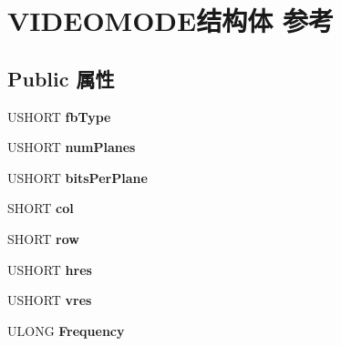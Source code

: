 \hypertarget{struct_v_i_d_e_o_m_o_d_e}{}\section{V\+I\+D\+E\+O\+M\+O\+D\+E结构体 参考}
\label{struct_v_i_d_e_o_m_o_d_e}
\subsection*{Public 属性}
\begin{DoxyCompactItemize}
\item 
\mbox{\label{struct_v_i_d_e_o_m_o_d_e_adb5309f18fe5cae6007d4b016e06a90e}} 
U\+S\+H\+O\+RT {\bfseries fb\+Type}
\item 
\mbox{\label{struct_v_i_d_e_o_m_o_d_e_a9226fad223cb28b54c5a1d9e00a4f569}} 
U\+S\+H\+O\+RT {\bfseries num\+Planes}
\item 
\mbox{\label{struct_v_i_d_e_o_m_o_d_e_a9f7b6f6f830ae6412cc31e1790c7ac5b}} 
U\+S\+H\+O\+RT {\bfseries bits\+Per\+Plane}
\item 
\mbox{\label{struct_v_i_d_e_o_m_o_d_e_ac99f8af8c3e09298e5dbf8909d176768}} 
S\+H\+O\+RT {\bfseries col}
\item 
\mbox{\label{struct_v_i_d_e_o_m_o_d_e_a2d85b5e5a7e09c70497e43b710487a4c}} 
S\+H\+O\+RT {\bfseries row}
\item 
\mbox{\label{struct_v_i_d_e_o_m_o_d_e_a7464f26da75f38172e5e2d8f093461ec}} 
U\+S\+H\+O\+RT {\bfseries hres}
\item 
\mbox{\label{struct_v_i_d_e_o_m_o_d_e_a1f6076e01a4c28c7e9e10a1d47f162e7}} 
U\+S\+H\+O\+RT {\bfseries vres}
\item 
\mbox{\label{struct_v_i_d_e_o_m_o_d_e_a125fec651afb0756ec38a34c2af23b35}} 
U\+L\+O\+NG {\bfseries Frequency}
\item 
\mbox{\label{struct_v_i_d_e_o_m_o_d_e_accccd9a79dd50cfe46b2c589888e79b6}} 

\end{DoxyCompactItemize}

